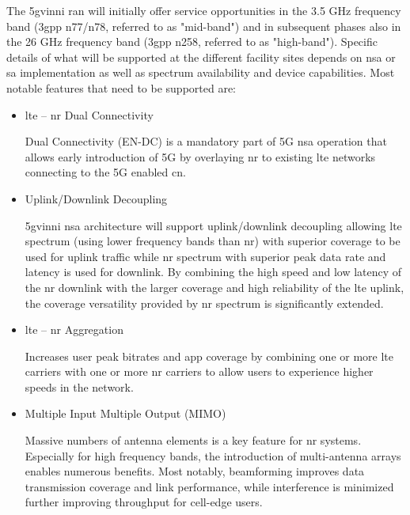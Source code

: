     The \acrshort{5gvinni} \acrshort{ran} will initially offer service opportunities in the 3.5 GHz frequency band (\acrshort{3gpp} n77/n78, referred to as "mid-band") and in subsequent phases also in the 26 GHz frequency band (\acrshort{3gpp} n258, referred to as "high-band"). Specific details of what will be supported at the different facility sites depends on \acrshort{nsa} or \acrshort{sa} implementation as well as spectrum availability and device capabilities. Most notable features that need to be supported are:
\newpage
        \begin{itemize}
        
        \item \acrshort{lte} – \acrshort{nr} Dual Connectivity
        
        Dual Connectivity (EN-DC) is a mandatory part of 5G \acrshort{nsa} operation that allows early introduction of 5G by overlaying \acrshort{nr} to existing \acrshort{lte} networks connecting to the 5G enabled \acrshort{cn}.
        
        \item Uplink/Downlink Decoupling
        
        \acrshort{5gvinni} \acrshort{nsa} architecture will support uplink/downlink decoupling allowing \acrshort{lte} spectrum (using lower frequency bands than \acrshort{nr}) with superior coverage to be used for uplink traffic while \acrshort{nr} spectrum with superior peak data rate and latency is used for downlink. 
        By combining the high speed and low latency of the \acrshort{nr} downlink with the larger coverage and high reliability of the \acrshort{lte} uplink, the coverage versatility provided by \acrshort{nr} spectrum is significantly extended. 
        
        \item \acrshort{lte} – \acrshort{nr} Aggregation
        
        Increases user peak bitrates and app coverage by combining one or more \acrshort{lte} carriers with one or more \acrshort{nr} carriers to allow users to experience higher speeds in the network.
        
        \item Multiple Input Multiple Output (MIMO) 
        
        Massive numbers of antenna elements is a key feature for \acrshort{nr} systems. Especially for high frequency bands, the introduction of multi-antenna arrays enables numerous benefits. Most notably, beamforming improves data transmission coverage and link performance, while interference is minimized further improving throughput for cell-edge users.
        

\end{itemize}
